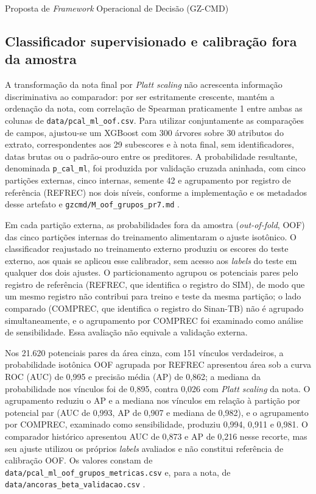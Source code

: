 \begin{chapter}{Proposta de \textit{Framework} Operacional de Decisão (GZ-CMD)}
\subsection{Classificador supervisionado e calibração fora da amostra}
\label{sec:cap8-classificador-oof}

A transformação da nota final por \textit{Platt scaling} não acrescenta informação discriminativa ao comparador: por ser estritamente crescente, mantém a ordenação da nota, com correlação de Spearman praticamente 1 entre ambas as colunas de \texttt{data/pcal\_ml\_oof.csv}. Para utilizar conjuntamente as comparações de campos, ajustou-se um XGBoost com 300 árvores sobre 30 atributos do extrato, correspondentes aos 29 subescores e à nota final, sem identificadores, datas brutas ou o padrão-ouro entre os preditores. A probabilidade resultante, denominada \texttt{p\_cal\_ml}, foi produzida por validação cruzada aninhada, com cinco partições externas, cinco internas, semente 42 e agrupamento por registro de referência (REFREC) nos dois níveis, conforme a implementação e os metadados desse artefato e \texttt{gzcmd/M\_oof\_grupos\_pr7.md} \cite{Jardim2026phdrepo}.

Em cada partição externa, as probabilidades fora da amostra (\textit{out-of-fold}, OOF) das cinco partições internas do treinamento alimentaram o ajuste isotônico. O classificador reajustado no treinamento externo produziu os escores do teste externo, aos quais se aplicou esse calibrador, sem acesso aos \textit{labels} do teste em qualquer dos dois ajustes. O particionamento agrupou os potenciais pares pelo registro de referência (REFREC, que identifica o registro do SIM), de modo que um mesmo registro não contribui para treino e teste da mesma partição; o lado comparado (COMPREC, que identifica o registro do Sinan-TB) não é agrupado simultaneamente, e o agrupamento por COMPREC foi examinado como análise de sensibilidade. Essa avaliação não equivale a validação externa.

Nos 21.620 potenciais pares da área cinza, com 151 vínculos verdadeiros, a probabilidade isotônica OOF agrupada por REFREC apresentou área sob a curva ROC (AUC) de 0,995 e precisão média (AP) de 0,862; a mediana da probabilidade nos vínculos foi de 0,895, contra 0,026 com \textit{Platt scaling} da nota. O agrupamento reduziu o AP e a mediana nos vínculos em relação à partição por potencial par (AUC de 0,993, AP de 0,907 e mediana de 0,982), e o agrupamento por COMPREC, examinado como sensibilidade, produziu 0,994, 0,911 e 0,981. O comparador histórico apresentou AUC de 0,873 e AP de 0,216 nesse recorte, mas seu ajuste utilizou os próprios \textit{labels} avaliados e não constitui referência de calibração OOF. Os valores constam de \texttt{data/pcal\_ml\_oof\_grupos\_metricas.csv} e, para a nota, de \texttt{data/ancoras\_beta\_validacao.csv} \cite{Jardim2026phdrepo}.


\end{chapter}
